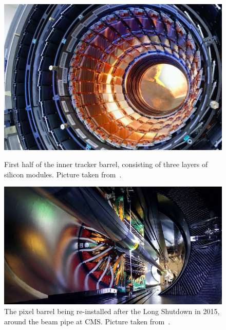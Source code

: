        \begin{figure}[htbp]
 	\centering
 	 	\begin{minipage}[t]{0.4\linewidth}
 		\includegraphics[width=\linewidth]{2_ExperimentalSetup/Figures/cmsbarrel}
 		\caption{First half of the inner tracker barrel, consisting of three layers of silicon modules. Picture taken from~\cite{beautiful:1998635}.}
 		\label{fig:Trackpics}
 	\end{minipage}
 	\hfill
 	\begin{minipage}[t]{0.5\linewidth}
 		\includegraphics[width=\linewidth]{2_ExperimentalSetup/Figures/cmspixel}
 		\caption{The pixel barrel being re-installed after the Long Shutdown in 2015, around the beam pipe at CMS. Picture taken from~\cite{Christine:2024986}.}
 		\label{fig:pix}
 	\end{minipage}


 \end{figure}
 
